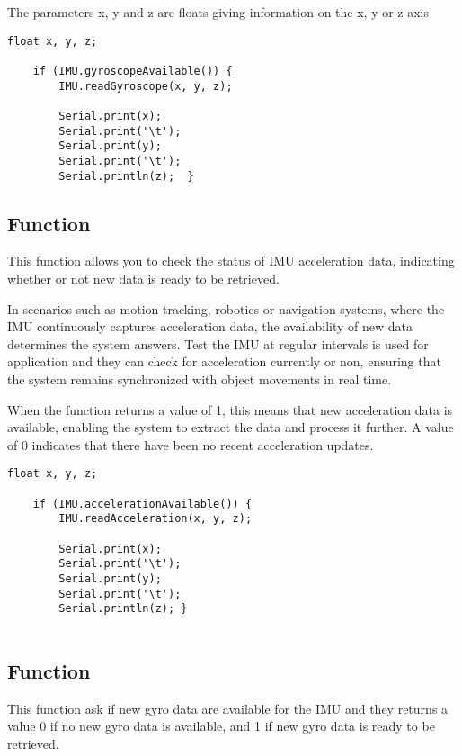 The parameters x, y and z are floats giving information on the x, y or z axis 

\begin{lstlisting}[style=Arduino]
    float x, y, z;
    
    if (IMU.gyroscopeAvailable()) {
        IMU.readGyroscope(x, y, z);
        
        Serial.print(x);
        Serial.print('\t');
        Serial.print(y);
        Serial.print('\t');
        Serial.println(z);	}
\end{lstlisting}



\subsection{Function }

This function allows you to check the status of IMU acceleration data, indicating whether or not new data is ready to be retrieved.

In scenarios such as motion tracking, robotics or navigation systems, where the IMU continuously captures acceleration data, the availability of new data determines the system answers. Test the IMU at regular intervals is used for application and they can check for acceleration currently or non, ensuring that the system remains synchronized with object movements in real time.

When the function returns a value of 1, this means that new acceleration data is available, enabling the system to extract the data and process it further. A value of 0 indicates that there have been no recent acceleration updates.

\begin{lstlisting}[style=Arduino]
    float x, y, z;
    
    if (IMU.accelerationAvailable()) {
        IMU.readAcceleration(x, y, z);
        
        Serial.print(x);
        Serial.print('\t');
        Serial.print(y);
        Serial.print('\t');
        Serial.println(z); }
    
\end{lstlisting}


\subsection{Function }

This function ask if new gyro data are available for the IMU and they returns a value 0 if no new gyro data is available, and 1 if new gyro data is ready to be retrieved.

